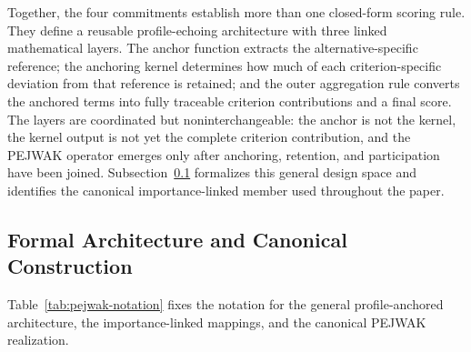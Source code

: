 \documentclass[reqno,11pt]{amsart}
\theoremstyle{definition}
\theoremstyle{plain}
\theoremstyle{remark}
\begin{document}
Together, the four commitments establish more than one closed-form
scoring rule. They define a reusable profile-echoing architecture with
three linked mathematical layers. The anchor function extracts the
alternative-specific reference; the anchoring kernel determines how much of each
criterion-specific deviation from that reference is retained; and the
outer aggregation rule converts the anchored terms into fully traceable
criterion contributions and a final score. The layers are coordinated
but noninterchangeable: the anchor is not the kernel, the kernel output
is not yet the complete criterion contribution, and the PEJWAK operator
emerges only after anchoring, retention, and participation have been
joined. Subsection~\ref{subsec:formal-architecture} formalizes this
general design space and identifies the canonical importance-linked
member used throughout the paper.

\subsection{Formal Architecture and Canonical Construction}
\label{subsec:formal-architecture}

Table~\ref{tab:pejwak-notation} fixes the notation for the general profile-anchored architecture, the importance-linked mappings, and the canonical PEJWAK realization.
\end{document}

